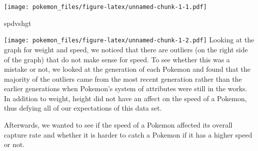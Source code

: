 \documentclass[
]{article}
\newenvironment{Shaded}{\begin{snugshade}}{\end{snugshade}}
\newcommand{\AttributeTok}[1]{\textcolor[rgb]{0.77,0.63,0.00}{#1}}
\newcommand{\CommentTok}[1]{\textcolor[rgb]{0.56,0.35,0.01}{\textit{#1}}}
\newcommand{\ConstantTok}[1]{\textcolor[rgb]{0.00,0.00,0.00}{#1}}
\newcommand{\DecValTok}[1]{\textcolor[rgb]{0.00,0.00,0.81}{#1}}
\newcommand{\FloatTok}[1]{\textcolor[rgb]{0.00,0.00,0.81}{#1}}
\newcommand{\FunctionTok}[1]{\textcolor[rgb]{0.00,0.00,0.00}{#1}}
\newcommand{\NormalTok}[1]{#1}
\newcommand{\SpecialCharTok}[1]{\textcolor[rgb]{0.00,0.00,0.00}{#1}}
\newcommand{\StringTok}[1]{\textcolor[rgb]{0.31,0.60,0.02}{#1}}
\begin{document}
\texttt{[image: pokemon\_files/figure-latex/unnamed-chunk-1-1.pdf]}

\begin{Shaded}
\begin{Highlighting}[]
\NormalTok{spdvshgt}
\end{Highlighting}
\end{Shaded}

\texttt{[image: pokemon\_files/figure-latex/unnamed-chunk-1-2.pdf]}
Looking at the graph for weight and speed, we noticed that there are
outliers (on the right side of the graph) that do not make sense for
speed. To see whether this was a mistake or not, we looked at the
generation of each Pokemon and found that the majority of the outliers
came from the most recent generation rather than the earlier generations
when Pokemon's system of attributes were still in the works. In addition
to weight, height did not have an affect on the speed of a Pokemon, thus
defying all of our expectations of this data set.

Afterwards, we wanted to see if the speed of a Pokemon affected its
overall capture rate and whether it is harder to catch a Pokemon if it
has a higher speed or not.

\begin{Shaded}
\end{Shaded}
\end{document}

